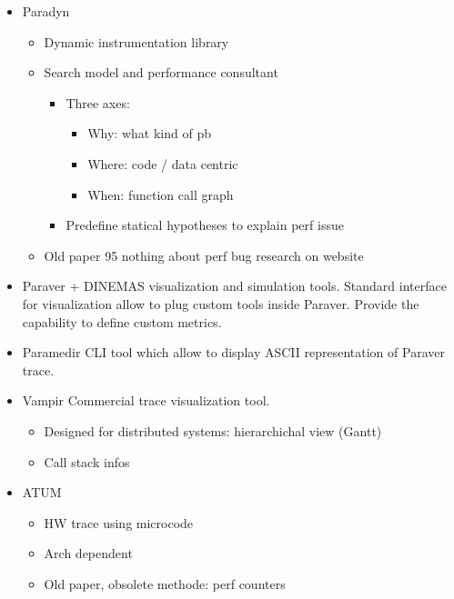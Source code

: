 \begin{itemize}
    \item Paradyn \cite{Miller95Paradyn}
        \begin{itemize}
            \item Dynamic instrumentation library
            \item Search model and performance consultant
                \begin{itemize}
                    \item Three axes:
                        \begin{itemize}
                            \item Why: what kind of pb
                            \item Where: code / data centric
                            \item When: function call graph
                        \end{itemize}
                    \item Predefine statical hypotheses to explain perf issue
                \end{itemize}
            \item Old paper 95 nothing about perf bug research on website
        \end{itemize}
    \item Paraver + DINEMAS \cite{Pillet95PARAVER} visualization and
        simulation tools. Standard interface for visualization allow to plug
        custom tools inside Paraver. Provide the capability to define custom
        metrics.
    \item Paramedir \cite{Jost04Paramedir} CLI tool which allow to display
        ASCII representation of Paraver trace.
    \item Vampir  \cite{Brunst01Performance} %
        Commercial trace visualization tool.
        \begin{itemize}
            \item Designed for distributed systems: hierarchichal view (Gantt)
            \item Call stack infos
        \end{itemize}
    \item ATUM \cite{Agarwal86ATUM}
        \begin{itemize}
            \item HW trace using microcode
            \item Arch dependent
            \item Old paper, obsolete methode: perf counters

\end{itemize}
\end{itemize}
